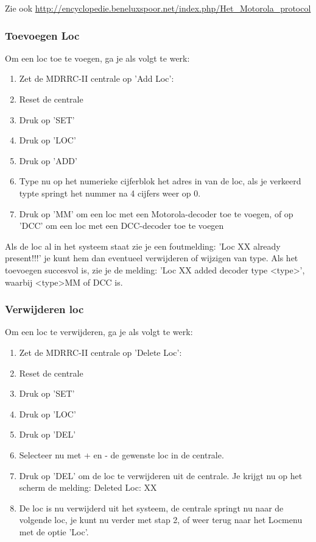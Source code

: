 \documentclass[12pt,a4paper]{report}
\begin{document}
Zie ook \url{http://encyclopedie.beneluxspoor.net/index.php/Het_Motorola_protocol}

\subsubsection{Toevoegen Loc}
Om een loc toe te voegen, ga je als volgt te werk:

\begin{enumerate}
\item Zet de MDRRC-II centrale op 'Add Loc': 
\item Reset de centrale
\item Druk op 'SET'
\item Druk op 'LOC'
\item Druk op 'ADD'
\item Type nu op het numerieke cijferblok het adres in van de loc, als je verkeerd typte springt het nummer na 4 cijfers weer op 0.
\item Druk op 'MM' om een loc met een Motorola-decoder toe te voegen, of op 'DCC' om een loc met een DCC-decoder toe te voegen
\end{enumerate}

Als de loc al in het systeem staat zie je een foutmelding:
 'Loc XX already present!!!'
je kunt hem dan eventueel verwijderen of wijzigen van type. Als het toevoegen succesvol is, zie je de melding: 'Loc XX added decoder type \textless type\textgreater ', 
waarbij \textless type\textgreater  MM of DCC is.
\subsubsection{Verwijderen loc}
Om een loc te verwijderen, ga je als volgt te werk:
\begin{enumerate}
\item Zet de MDRRC-II centrale op 'Delete Loc': 
\item Reset de centrale
\item Druk op 'SET'
\item Druk op 'LOC'
\item Druk op 'DEL'
\item Selecteer nu met + en - de gewenste loc in de centrale.
\item Druk op 'DEL' om de loc te verwijderen uit de centrale. Je krijgt nu op het scherm de melding:
Deleted Loc: XX
\item De loc is nu verwijderd uit het systeem, de centrale springt nu naar de volgende loc, je kunt nu verder met stap 2, of weer terug naar het Locmenu met de optie 'Loc'.
\end{enumerate}
\end{document}
